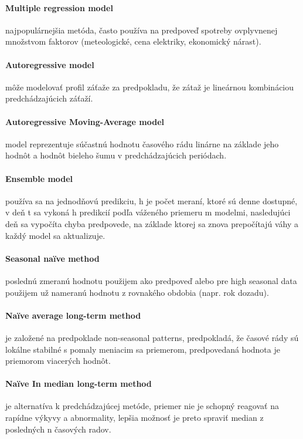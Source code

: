 \documentclass[12pt,oneside,slovak,a4paper]{book}
\begin{document}
\paragraph{Multiple regression model}
najpopulárnejšia metóda, často používa na predpoveď spotreby ovplyvnenej
množstvom faktorov (meteologické, cena elektriky, ekonomický
nárast)\cite{KumarSingh2013}.

\paragraph{Autoregressive model}
môže modelovať profil záťaže za predpokladu, že zátaž je lineárnou kombináciou
predchádzajúcich záťaží\cite{KumarSingh2013}.

\paragraph{Autoregressive Moving-Average model}
model reprezentuje súčastnú hodnotu časového rádu linárne na základe jeho hodnôt
a hodnôt bieleho šumu v predchádzajúcich periódach\cite{KumarSingh2013}.

\paragraph{Ensemble model}
používa sa na jednodňovú predikciu, h je počet meraní, ktoré sú denne dostupné,
v deň t sa vykoná h predikcií podľa váženého priemeru m modelmi, nasledujúci
deň sa vypočíta chyba predpovede, na základe ktorej sa znova prepočítajú váhy
a každý model sa aktualizuje\cite{Grmanova2016}.

\paragraph{Seasonal naïve method}
poslednú zmeranú hodnotu použijem ako predpoveď alebo pre high seasonal data
použijem už nameranú hodnotu z rovnakého obdobia (napr. rok
dozadu)\cite{Grmanova2016}.

\paragraph{Naïve average long-term method}
je založené na predpoklade non-seasonal patterns, predpokladá, že časové rády sú
lokálne stabilné s pomaly meniacim sa priemerom, predpovedaná hodnota je
priemorom viacerých hodnôt\cite{Grmanova2016}.

\paragraph{Naïve In median long-term method}
je alternatíva k predchádzajúcej metóde, priemer nie je schopný reagovať na
rapídne výkyvy a abnormality, lepšia možnosť je preto spraviť median
z posledných n časových radov\cite{Grmanova2016}.
\end{document}
